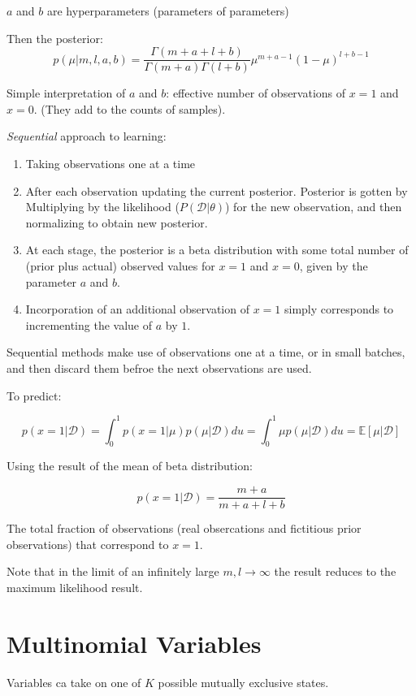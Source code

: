 $a$ and $b$ are hyperparameters (parameters of parameters)

Then the posterior:
\[ p(\mu|m, l, a, b) = \frac{\Gamma(m+a+l+b)}{\Gamma(m+a)\Gamma(l+b)}\mu^{m+a-1} {(1-\mu)}^{l+b-1}\]

Simple interpretation of $a$ and $b$: effective number of observations of
$x=1$ and $x = 0$. (They add to the counts of samples).

\emph{Sequential} approach to learning:
\begin{enumerate}
    \item Taking observations one at a time
    \item After each observation updating the current posterior.
        Posterior is gotten by Multiplying by the likelihood ($P(\mathcal{D}|\theta)$) for the
        new observation, and then normalizing to obtain new posterior.
    \item At each stage, the posterior is a beta distribution with some
        total number of (prior plus actual) observed values for $x = 1$
        and $x = 0$, given by the parameter $a$ and $b$.
    \item Incorporation of an additional observation of $x = 1$ simply
        corresponds to incrementing the value of $a$ by $1$.
\end{enumerate}

Sequential methods make use of observations one at a time, or in small
batches, and then discard them befroe the next observations are used.

To predict:

\[ p(x = 1|\mathcal{D}) = \int_0^1 p(x = 1|\mu) p(\mu|\mathcal{D}) du =
    \int_0^1 \mu p(\mu|\mathcal{D}) du = \mathbb{E}[\mu|\mathcal{D}]\]

Using the result of the mean of beta distribution:

\begin{equation}
 p(x = 1|\mathcal{D}) = \frac{m+a}{m+a+l+b}
\end{equation}

The total fraction of observations (real obsercations and fictitious prior
observations) that correspond to $x = 1$.

Note that in the limit of an infinitely large $m, l \rightarrow \infty$
the result reduces to the maximum likelihood result.

\section{Multinomial Variables}
Variables ca take on one of $K$ possible mutually exclusive states.

